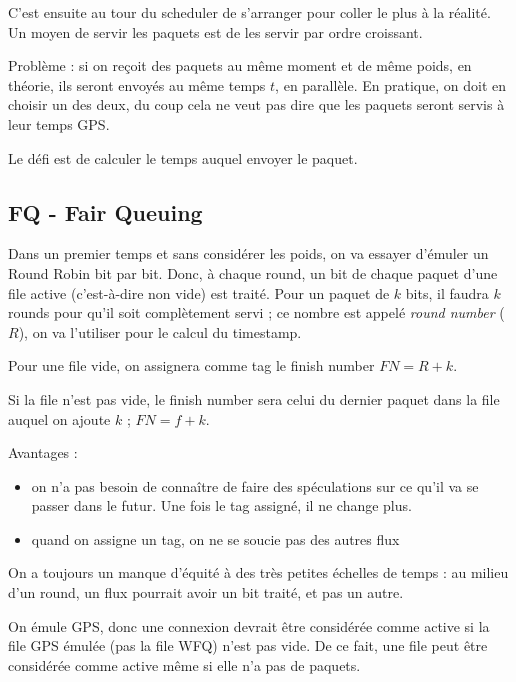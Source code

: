 			C'est ensuite au tour du scheduler de s'arranger pour coller le plus à la réalité. Un moyen de servir les paquets est de les servir par ordre croissant.

			
			Problème : si on reçoit des paquets au même moment et de même poids, en théorie, ils seront envoyés au même temps $t$, en parallèle. En pratique, on doit en choisir un des deux, du coup cela ne veut pas dire que les paquets seront servis à leur temps GPS.
			
			Le défi est de calculer le temps auquel envoyer le paquet.
			
			
			\subsection{FQ - Fair Queuing}
			Dans un premier temps et sans considérer les poids, on va essayer d'émuler un Round Robin bit par bit. Donc, à chaque round, un bit de chaque paquet d'une file active (c'est-à-dire non vide) est traité. Pour un paquet de $k$ bits, il faudra $k$ rounds pour qu'il soit complètement servi ; ce nombre est appelé \textit{round number} ($R$), on va l'utiliser pour le calcul du timestamp.
			
			Pour une file vide, on assignera comme tag le finish number $FN = R + k$.
			
			
			Si la file n'est pas vide, le finish number sera celui du dernier paquet dans la file auquel on ajoute $k$ ; $FN = f + k$.
			
			
			Avantages : 
			
			\begin{itemize}
				\item on n'a pas besoin de connaître de faire des spéculations sur ce qu'il va se passer dans le futur. Une fois le tag assigné, il ne change plus.
				\item quand on assigne un tag, on ne se soucie pas des autres flux
			\end{itemize}
			
			On a toujours un manque d'équité à des très petites échelles de temps : au milieu d'un round, un flux pourrait avoir un bit traité, et pas un autre.
			
			On émule GPS, donc une connexion devrait être considérée comme active si la file GPS émulée (pas la file WFQ) n'est pas vide. De ce fait, une file peut être considérée comme active même si elle n'a pas de paquets.
			
